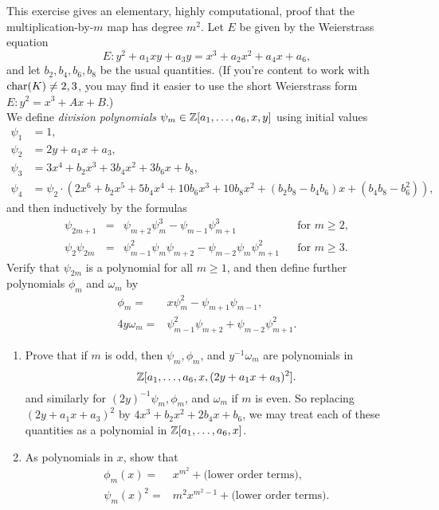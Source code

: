\documentclass[12pt,reqno]{amsart}
\begin{document}
\begin{exe}\label{3.7}
This exercise gives an elementary, highly computational, proof that the multiplication-by-$m$ map has degree $m^2$.  Let $E$ be given by the Weierstrass equation 
\[
E: y^2+a_1 xy+a_3y=x^3+a_2x^2+a_4x+a_6,
\]
and let $b_2, b_4, b_6, b_8$ be the usual quantities.  (If you're content to work with ${\operatorname{char}}(K)\neq 2, 3$, you may find it easier to use the short Weierstrass form $E: y^2=x^3+Ax+B$.)\\

We define \emph{division polynomials} $\psi_m \in {\mathbb Z}[a_1, \hdots, a_6, x, y]$ using initial values
\begin{align*}
\psi_1&=1, \\
\psi_2&=2y+a_1x+a_3, \\
\psi_3&=3x^4+b_2x^3+3b_4x^2+3b_6x+b_8,\\
\psi_4&=\psi_2 \cdot \left(2x^6+b_2x^5+5b_4x^4+10b_6x^3+10b_8x^2+(b_2b_8-b_4b_6)x+(b_4b_8-b_6^2)\right),
\end{align*}
and then inductively by the formulas
\begin{align*}
\psi_{2m+1}&=&\psi_{m+2}\psi_m^3-\psi_{m-1}\psi_{m+1}^3& &\mbox{for }m \geq 2,\\
\psi_2 \psi_{2m}&=&\psi_{m-1}^2\psi_m\psi_{m+2}-\psi_{m-2}\psi_m\psi_{m+1}^2& &\mbox{for }m \geq 3.
\end{align*}
Verify that $\psi_{2m}$ is a polynomial for all $m\geq 1$, and then define further polynomials $\phi_m$ and $\omega_m$ by
\begin{align*}
\phi_m=&x\psi_m^2-\psi_{m+1}\psi_{m-1},\\
4y\omega_m=&\psi_{m-1}^2\psi_{m+2}+\psi_{m-2}\psi_{m+1}^2.
\end{align*}
\begin{enumerate}
\item\label{3.7a}
Prove that if $m$ is odd, then $\psi_m, \phi_m$, and $y^{-1}\omega_m$ are polynomials in
\[
{\mathbb Z}[a_1, \hdots, a_6, x, (2y+a_1x+a_3)^2].
\]
and similarly for $(2y)^{-1}\psi_m, \phi_m$, and $\omega_m$ if $m$ is even.  So replacing $(2y+a_1x+a_3)^2$ by $4x^3+b_2x^2+2b_4x+b_6$, we may treat each of these quantities as a polynomial in ${\mathbb Z}[a_1, \hdots, a_6, x]$.

\item\label{3.7b}
As polynomials in $x$, show that
\begin{align*}
\phi_m(x)=&x^{m^2}+\text{(lower order terms)},\\
\psi_m(x)^2=&m^2x^{m^2-1}+\text{(lower order terms)}.
\end{align*}


\end{enumerate}
\end{exe}
\end{document}
